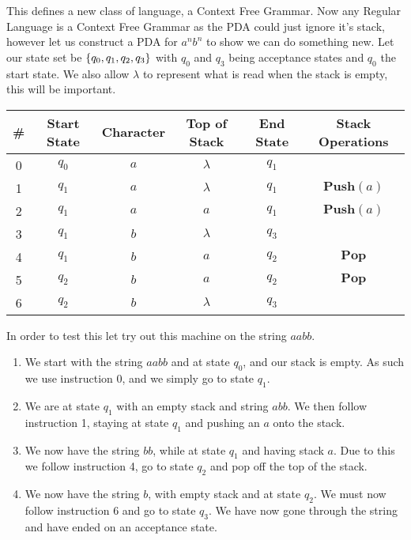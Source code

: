 \documentclass{article}
\begin{document}
	This defines a new class of language, a Context Free Grammar. Now any Regular Language is a Context Free Grammar as the PDA could just ignore it's stack, however let us construct a PDA for $a^nb^n$ to show we can do something new. Let our state set be $\left\{ {q_0, q_1,q_2,q_3} \right\}$ with $q_0$ and $q_3$ being acceptance states and $q_0$ the start state. We also allow $\lambda$ to represent what is read when the stack is empty, this will be important.
	\begin{center}
		\begin{tabular}{c|c|c|c|c|c}
			\#&Start State & Character & Top of Stack & End State &Stack Operations\\
			\hline
			0&$q_0$ & $a$ & $\lambda$ & $q_1$ & \\
			1&$q_1$ & $a$ & $\lambda$ & $q_1$ & $\textbf{Push}(a)$ \\  
			2&$q_1$ & $a$ & $a$ & $q_1$ & $\textbf{Push}(a)$ \\
			3&$q_1$ & $b$ & $\lambda$ & $q_3$ & \\
			4&$q_1$ & $b$ & $a$ & $q_2$ & $\textbf{Pop}$ \\
			5&$q_2$ & $b$ & $a$ & $q_2$ & $\textbf{Pop}$ \\
			6&$q_2$&$b$&$\lambda$&$q_3$&
		\end{tabular}
	\end{center}
	In order to test this let try out this machine on the string $aabb$.
	\begin{enumerate}
		\item We start with the string $aabb$ and at state $q_0$, and our stack is empty. As such we use instruction 0, and we simply go to state $q_1$.
		\item We are at state $q_1$ with an empty stack and string $abb$. We then follow instruction 1, staying at state $q_1$ and pushing an $a$ onto the stack.
		\item We now have the string $bb$, while at state $q_1$ and having stack $a$. Due to this we follow instruction 4, go to state $q_2$ and pop off the top of the stack.
		\item We now have the string $b$, with empty stack and at state $q_2$. We must now follow instruction 6 and go to state $q_3$. We have now gone through the string and have ended on an acceptance state.
	\end{enumerate}
	
\end{document}
